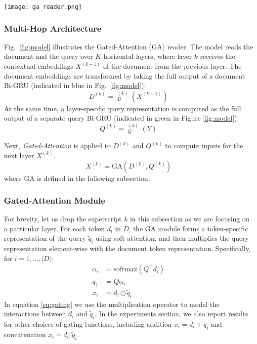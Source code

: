 \documentclass[11pt,a4paper]{article}
\DeclareMathOperator{\bigru}{\overset{\longleftrightarrow}{\mathrm{GRU}}}
\begin{document}
\begin{figure*}[t]
\centering
\caption{Gated-Attention Reader. Dashed lines represent dropout connections.}
\texttt{[image: ga\_reader.png]}
\label{fig:model}
\end{figure*}

\subsubsection{Multi-Hop Architecture}
Fig.\ \ref{fig:model} illustrates the Gated-Attention (GA) reader. 
The model reads the document and the query over $K$ horizontal layers,
where layer $k$ receives the contextual embeddings $X^{(k-1)}$ of the document from the previous layer. The document embeddings are transformed by taking the full output of a document Bi-GRU (indicated in blue in Fig.\ \ref{fig:model}):
\begin{equation}
    D^{(k)} = \bigru^{(k)}_D(X^{(k-1)})
\end{equation}
At the same time, a layer-specific query representation is computed as the full output of a separate query Bi-GRU (indicated in green in Figure \ref{fig:model}):
\begin{equation}
    Q^{(k)} = \bigru^{(k)}_Q(Y)
\end{equation}

Next, \textit{Gated-Attention} is applied to $D^{(k)}$ and $Q^{(k)}$ to compute inputs for the next layer $X^{(k)}$.
\begin{equation}
    X^{(k)} = \mathrm{GA}(D^{(k)}, Q^{(k)})
\end{equation}
where GA is defined in the following subsection.

\subsubsection{Gated-Attention Module}
For brevity,
let us drop the superscript $k$ in this subsection as we are focusing on a particular layer.
For each token $d_i$ in $D$,
the GA module forms a token-specific representation of the query $\tilde{q}_i$ using soft attention, and then multiplies the query representation element-wise with the document token representation. Specifically, for $i=1,\ldots,|D|$:
\begin{align}
    \alpha_i &= \text{softmax}(Q^\top d_i) \label{eq:q_att} \\
\tilde{q}_i &= Q\alpha_i \nonumber \\
x_i &= d_i \odot \tilde{q}_i
\label{eq:gating}
\end{align}
In equation \eqref{eq:gating} we use the multiplication operator
to model the interactions between $d_i$ and $\tilde{q}_i$.
In the experiments section,
we also report results for other choices of gating functions,
including addition $x_i = d_i + \tilde{q}_i$ and concatenation $x_i = d_i \Vert \tilde{q}_i$.
\end{document}
